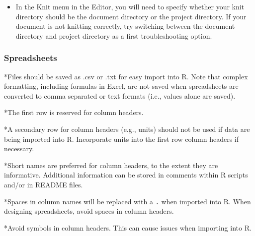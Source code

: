 \documentclass[]{article}
\providecommand{\tightlist}{%
  \setlength{\itemsep}{0pt}\setlength{\parskip}{0pt}}
\begin{document}
\begin{itemize}
\tightlist
\item
  In the Knit menu in the Editor, you will need to specify whether your
  knit directory should be the document directory or the project
  directory. If your document is not knitting correctly, try switching
  between the document directory and project directory as a first
  troubleshooting option.
\end{itemize}

\hypertarget{spreadsheets}{%
\subsubsection{Spreadsheets}\label{spreadsheets}}

*Files should be saved as .csv or .txt for easy import into R. Note that
complex formatting, including formulas in Excel, are not saved when
spreadsheets are converted to comma separated or text formats (i.e.,
values alone are saved).

*The first row is reserved for column headers.

*A secondary row for column headers (e.g., units) should not be used if
data are being imported into R. Incorporate units into the first row
column headers if necessary.

*Short names are preferred for column headers, to the extent they are
informative. Additional information can be stored in comments within R
scripts and/or in README files.

*Spaces in column names will be replaced with a \texttt{.} when imported
into R. When designing spreadsheets, avoid spaces in column headers.

*Avoid symbols in column headers. This can cause issues when importing
into R.
\end{document}
